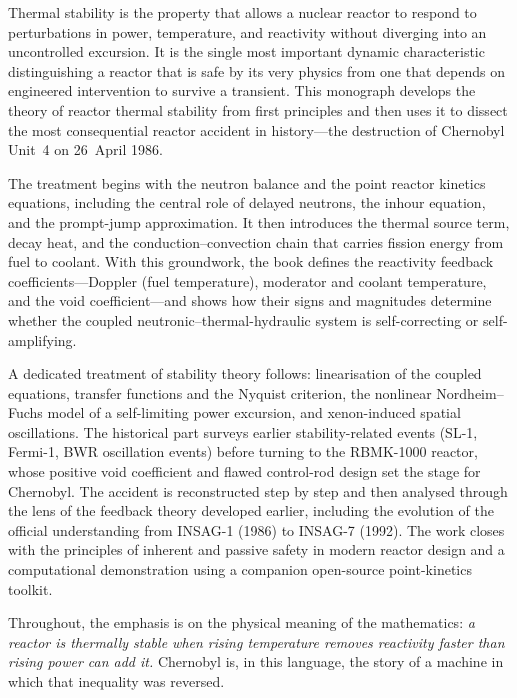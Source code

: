 Thermal stability is the property that allows a nuclear reactor to respond to
perturbations in power, temperature, and reactivity without diverging into an
uncontrolled excursion. It is the single most important dynamic characteristic
distinguishing a reactor that is safe by its very physics from one that depends
on engineered intervention to survive a transient. This monograph develops the
theory of reactor thermal stability from first principles and then uses it to
dissect the most consequential reactor accident in history---the destruction of
Chernobyl Unit~4 on 26~April 1986.

The treatment begins with the neutron balance and the point reactor kinetics
equations, including the central role of delayed neutrons, the inhour equation,
and the prompt-jump approximation. It then introduces the thermal source term,
decay heat, and the conduction--convection chain that carries fission energy
from fuel to coolant. With this groundwork, the book defines the reactivity
feedback coefficients---Doppler (fuel temperature), moderator and coolant
temperature, and the void coefficient---and shows how their signs and magnitudes
determine whether the coupled neutronic--thermal-hydraulic system is
self-correcting or self-amplifying.

A dedicated treatment of stability theory follows: linearisation of the coupled
equations, transfer functions and the Nyquist criterion, the nonlinear
Nordheim--Fuchs model of a self-limiting power excursion, and xenon-induced
spatial oscillations. The historical part surveys earlier stability-related
events (SL-1, Fermi-1, BWR oscillation events) before turning to the RBMK-1000
reactor, whose positive void coefficient and flawed control-rod design set the
stage for Chernobyl. The accident is reconstructed step by step and then
analysed through the lens of the feedback theory developed earlier, including
the evolution of the official understanding from INSAG-1 (1986) to INSAG-7
(1992). The work closes with the principles of inherent and passive safety in
modern reactor design and a computational demonstration using a companion
open-source point-kinetics toolkit.

Throughout, the emphasis is on the physical meaning of the mathematics:
\emph{a reactor is thermally stable when rising temperature removes reactivity
faster than rising power can add it.} Chernobyl is, in this language, the story
of a machine in which that inequality was reversed.
